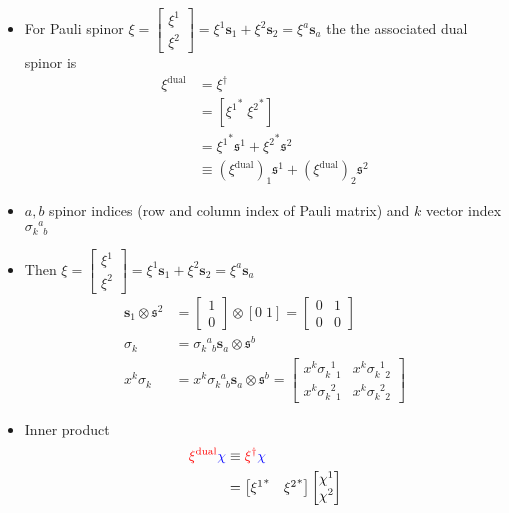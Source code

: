 \documentclass[../main.tex]{subfiles}
\begin{document}
\begin{itemize}
\begin{itemize}
\item For Pauli spinor $\xi=\left[\begin{matrix}
\xi^1\\ \xi^2\end{matrix}\right]=\xi^1\mathbf{s}_1+\xi^2\mathbf{s}_2=\xi^a\mathbf{s}_a$ the the associated dual spinor is
\begin{align}
\xi^\text{dual}
&=\xi^\dagger\\
&=[{\xi^1}^*\;{\xi^2}^*]\\
&={\xi^1}^*\mathfrak{s}^1+{\xi^2}^*\mathfrak{s}^2\\
&\equiv(\xi^\text{dual})_1\mathfrak{s}^1+(\xi^\text{dual})_2\mathfrak{s}^2
\end{align}
\item $a,b$ spinor indices (row and column index of Pauli matrix) and $k$ vector index $\sigma_{k\;\;b}^{\;\;a}$
\item Then $\xi=\left[\begin{matrix}
\xi^1\\ \xi^2\end{matrix}\right]=\xi^1\mathbf{s}_1+\xi^2\mathbf{s}_2=\xi^a\mathbf{s}_a$
\begin{align}
\mathbf{s}_1\otimes\mathfrak{s}^2&=\left[\begin{matrix}1\\0\end{matrix}\right]\otimes[0\;1]=\left[\begin{matrix}0&1\\0&0\end{matrix}\right]\\
\sigma_k&=\sigma_{k\;\;b}^{\;\;a}\mathbf{s}_a\otimes\mathfrak{s}^b\\
x^k\sigma_k&=x^k\sigma_{k\;\;b}^{\;\;a}\mathbf{s}_a\otimes\mathfrak{s}^b
=\left[\begin{matrix}x^k\sigma_{k\;\;1}^{\;\;1} & x^k\sigma_{k\;\;2}^{\;\;1}\\x^k\sigma_{k\;\;1}^{\;\;2} & x^k\sigma_{k\;\;2}^{\;\;2}\end{matrix}\right]
\end{align}
\item Inner product
\begin{align}
\textcolor{red}{\xi^\text{dual}}\textcolor{blue}{\chi}
&\equiv
\textcolor{red}{\xi^\dagger}\textcolor{blue}{\chi}\\
&=\left[\begin{matrix}{\xi^1}^*&{\xi^2}^*\end{matrix}\right]
\left[\begin{matrix}\chi^1\\\chi^2\end{matrix}\right]\\

\end{align}
\end{itemize}
\end{itemize}
\end{document}
